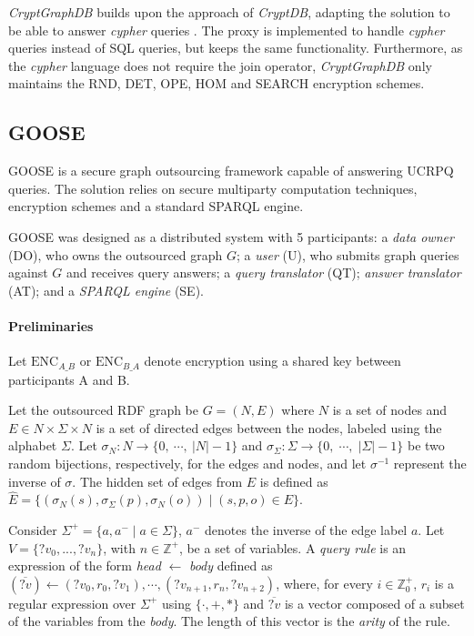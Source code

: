 \emph{CryptGraphDB} builds upon the approach of \emph{CryptDB}, adapting the solution to be able to answer \emph{cypher} queries \autocite{Neo4j_Inc_undated-ft}. The proxy is implemented to handle \emph{cypher} queries instead of \gls{SQL} queries, but keeps the same functionality. Furthermore, as the \emph{cypher} language does not require the join operator, \emph{CryptGraphDB} only maintains the RND, DET, OPE, HOM and SEARCH encryption schemes.

\subsection{GOOSE}

\gls{GOOSE} \autocite{Ciucanu2020-lx} is a secure graph outsourcing framework capable of answering \gls{UCRPQ} queries. The solution relies on secure multiparty computation techniques, encryption schemes and a standard SPARQL engine. 

\gls{GOOSE} was designed as a distributed system with 5 participants: a \emph{data owner} (DO), who owns the outsourced graph $G$; a \emph{user} (U), who submits graph queries against $G$ and receives query answers; a \emph{query translator} (QT); \emph{answer translator} (AT); and a \emph{\gls{SPARQL} engine} (SE).

\paragraph{Preliminaries}

Let $\textrm{ENC}_{A\_B}$ or $\textrm{ENC}_{B\_A}$ denote  encryption using a shared key between participants A and B. 

Let the outsourced \gls{RDF} graph be $G = (N, E)$ where $N$ is a set of nodes and $E \in N \times \Sigma \times N$ is a set of directed edges between the nodes, labeled using the alphabet $\Sigma$. Let $\sigma_N: N \to \{0,\:\cdots,\: \vert N \vert - 1\}$ and $\sigma_\Sigma : \Sigma \to \{0,\;\cdots,\; \vert \Sigma \vert - 1\}$ be two random bijections, respectively, for the edges and nodes, and let $\sigma^{-1}$ represent the inverse of $\sigma$. The hidden set of edges from $E$ is defined as $\hat{E} = \{(\sigma_N(s), \sigma_\Sigma(p), \sigma_N(o)) \;\vert\; (s, p, o) \in E\}$.

Consider $\Sigma^+= \{a, a^- \;\vert\; a \in \Sigma \}$, $a^-$ denotes the inverse of the edge label $a$. Let $V = \{?v_0,...,?v_ n\}$, with $n \in \mathbb{Z}^{+}$, be a set of variables. A \emph{query rule} is an expression of the form \emph{head} $\leftarrow$ \emph{body} defined as $(\overline{?v}) \leftarrow (?v_0, r_0, ?v_1),\cdots,(?v_{n+1}, r_n, ?v_{n+2} )$, where, for every $i \in \mathbb{Z}_0^{+}$, $r_i$ is a regular expression over $\Sigma^+$ using $\{\cdot, + , \ast\}$ and $\overline{?v}$ is a vector composed of a subset of the variables from the \emph{body}. The length of this vector is the \emph{arity} of the rule. 

